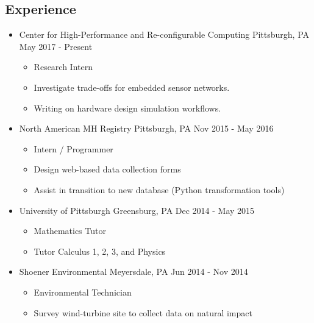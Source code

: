 \documentclass[18pt]{article}
\providecommand{\tightlist}{
    \setlength{\itemsep}{0pt}\setlength{\parskip}{0pt}
}
\begin{document}
    \subsection*{Experience}\label{experience}
      \begin{itemize}\tightlist
        
        \item Center for High-Performance and Re-configurable Computing \textbar{} Pittsburgh, PA \textbar{} May 2017 - Present
        \begin{itemize}\tightlist
          \item Research Intern
          \item Investigate trade-offs for embedded sensor networks.
          \item Writing on hardware design simulation workflows.
      	\end{itemize}
        
        \item North American MH Registry \textbar{} Pittsburgh, PA \textbar{} Nov 2015 - May 2016
        \begin{itemize}\tightlist
          \item Intern / Programmer
          \item Design web-based data collection forms
          \item Assist in transition to new database (Python transformation tools)
        \end{itemize}

        \item University of Pittsburgh \textbar{} Greensburg, PA \textbar{} Dec 2014 - May 2015
        \begin{itemize}\tightlist
          \item Mathematics Tutor
          \item Tutor Calculus 1, 2, 3, and Physics
        \end{itemize}
        
        \item Shoener Environmental \textbar{} Meyersdale, PA \textbar{} Jun 2014 - Nov 2014
        \begin{itemize}\tightlist
          \item Environmental Technician
          \item Survey wind-turbine site to collect data on natural impact
        \end{itemize}

      \end{itemize} %
\end{document}
